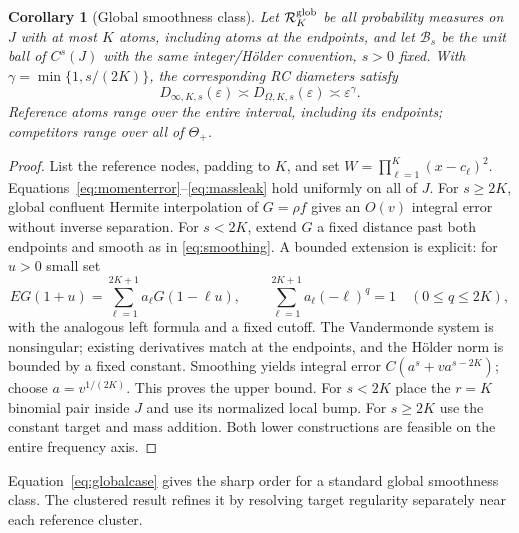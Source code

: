 \documentclass[10pt]{amsart}
\newtheorem{corollary}[theorem]{Corollary}
\theoremstyle{definition}
\theoremstyle{remark}
\theoremstyle{plain}
\newcommand{\eps}{\varepsilon}
\newcommand{\ThetaAll}{\Theta_+}
\begin{document}
\begin{corollary}[Global smoothness class]\label{cor:global}
Let $\mathcal R_K^{\rm glob}$ be all probability measures on $J$ with at most $K$ atoms, including atoms at the endpoints, and let $\mathcal B_s$ be the unit ball of $C^s(J)$ with the same integer/H\"older convention, $s>0$ fixed. With $\gamma=\min\{1,s/(2K)\}$, the corresponding RC diameters satisfy
\begin{equation}\label{eq:globalcase}
 D_{\infty,K,s}(\eps)\asymp D_{\Omega,K,s}(\eps)\asymp\eps^\gamma.
\end{equation}
Reference atoms range over the entire interval, including its endpoints; competitors range over all of $\ThetaAll$.
\end{corollary}
\begin{proof}
List the reference nodes, padding to $K$, and set $W=\prod_{\ell=1}^K(x-c_\ell)^2$. Equations~\eqref{eq:momenterror}--\eqref{eq:massleak} hold uniformly on all of $J$. For $s\ge2K$, global confluent Hermite interpolation of $G=\rho f$ gives an $O(v)$ integral error without inverse separation. For $s<2K$, extend $G$ a fixed distance past both endpoints and smooth as in \eqref{eq:smoothing}. A bounded extension is explicit: for $u>0$ small set
\[
 EG(1+u)=\sum_{\ell=1}^{2K+1}a_\ell G(1-\ell u),\qquad
 \sum_{\ell=1}^{2K+1}a_\ell(-\ell)^q=1\quad(0\le q\le2K),
\]
with the analogous left formula and a fixed cutoff. The Vandermonde system is nonsingular; existing derivatives match at the endpoints, and the H\"older norm is bounded by a fixed constant. Smoothing yields integral error $C(a^s+va^{s-2K})$; choose $a=v^{1/(2K)}$. This proves the upper bound. For $s<2K$ place the $r=K$ binomial pair inside $J$ and use its normalized local bump. For $s\ge2K$ use the constant target and mass addition. Both lower constructions are feasible on the entire frequency axis.
\end{proof}
Equation~\eqref{eq:globalcase} gives the sharp order for a standard global smoothness class. The clustered result refines it by resolving target regularity separately near each reference cluster.
\end{document}
